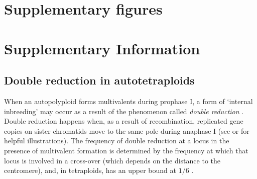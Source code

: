 \documentclass[unnumsec,webpdf,modern,large]{_oup-authoring-template}
\theoremstyle{thmstyleone}%
\theoremstyle{thmstyletwo}%
\theoremstyle{thmstylethree}%
\begin{document}
\clearpage
\setcounter{page}{1}


\clearpage
\renewcommand{\thefigure}{S\arabic{figure}}
\renewcommand{\thesection}{S\arabic{section}}
\renewcommand{\thealgorithm}{S\arabic{algorithm}}
\setcounter{figure}{0}
\setcounter{section}{0}
\setcounter{equation}{0}
\setcounter{algorithm}{0}

\onecolumn %

\section{Supplementary figures}

\section{Supplementary Information}

\subsection*{Double reduction in autotetraploids}

When an autopolyploid forms multivalents during prophase I, a form of `internal
inbreeding' may occur as a result of the phenomenon called \emph{double
reduction} \citep{huang2019}.
Double reduction happens when, as a result of recombination, replicated gene
copies on sister chromatids move to the same pole during anaphase I (see
\cite{stift2010} or \cite{huang2019} for helpful illustrations).
The frequency of double reduction at a locus in the presence of multivalent
formation is determined by the frequency at which that locus is involved in a
cross-over (which depends on the distance to the centromere), and, in
tetraploids, has an upper bound at \(1/6\) \citep{mather1935,stift2010}.
 
\end{document}
